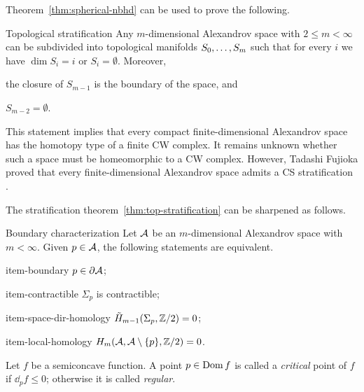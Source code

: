 Theorem~\ref{thm:spherical-nbhd} can be used to prove the following. 

\begin{thm}{Topological stratification}\label{thm:top-stratification}
Any $m$-dimensional Alexandrov space with $2\le m<\infty$ can be subdivided into topological manifolds $S_0,\z\dots,S_m$ such that for every $i$ we have $\dim S_i=i$ or $S_i=\emptyset$.
Moreover,
\begin{subthm}{}
the closure of $S_{m-1}$ is the boundary of the space, and
\end{subthm}

\begin{subthm}{}
$S_{m-2}=\emptyset$.
\end{subthm}

\end{thm}

This statement implies that every compact finite-dimensional Alexandrov space has the homotopy type of a finite CW complex.
It remains unknown whether such a space must be homeomorphic to a CW complex.
However, Tadashi Fujioka proved that every finite-dimensional Alexandrov space admits a CS stratification \cite{fujioka2025a}.

The stratification theorem~\ref{thm:top-stratification} can be sharpened as follows.

\begin{thm}{Boundary characterization}
Let $\mathcal{A}$ be an $m$-dimensional Alexandrov space with $m<\infty$.
Given $p\in\mathcal{A}$, the following statements are equivalent.

\begin{subthm}{item-boundary}
$p\in \partial \mathcal{A}$;
\end{subthm}

\begin{subthm}{item-contractible}
$\Sigma_p$ is contractible;
\end{subthm}

\begin{subthm}{item-space-dir-homology}
$\tilde H_{m-1}(\Sigma_p,\mathbb{Z}/2)= 0$;
\end{subthm}

\begin{subthm}{item-local-homology}
$H_m(\mathcal{A},\mathcal{A}\setminus \{p\},\mathbb{Z}/2)= 0$.
\end{subthm}

\end{thm}

Let $f$ be a semiconcave function.
A point $p\in \mathop{\rm Dom}\nolimits f$ is called a \emph{critical} point of $f$ if $\dd_pf\le 0$;
otherwise it is called \emph{regular}.

